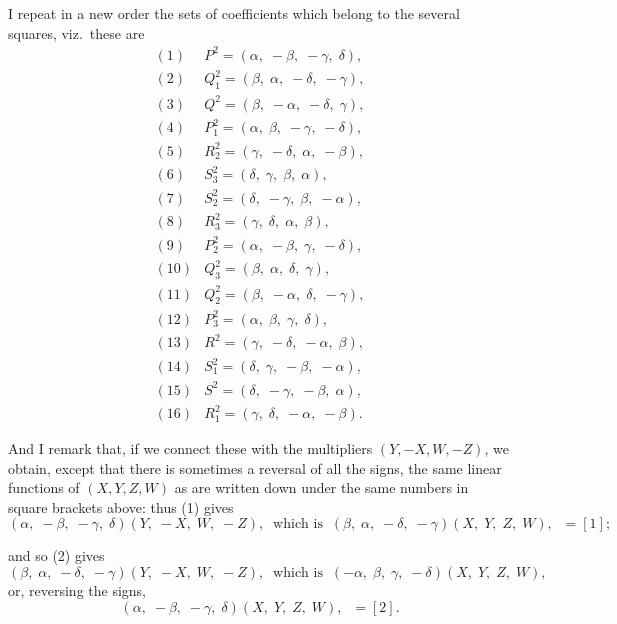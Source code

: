 \documentclass[11pt,a4paper]{article}
\begin{document}
I repeat in a new order the sets of coefficients which belong to the several squares, viz.\ these are
\[
\begin{array}{rl}
(1) & P^{2} = (\alpha,\;-\beta,\;-\gamma,\;\delta),\\
(2) & Q_{1}^{2} = (\beta,\;\alpha,\;-\delta,\;-\gamma),\\
(3) & Q^{2} = (\beta,\;-\alpha,\;-\delta,\;\gamma),\\
(4) & P_{1}^{2} = (\alpha,\;\beta,\;-\gamma,\;-\delta),\\
(5) & R_{2}^{2} = (\gamma,\;-\delta,\;\alpha,\;-\beta),\\
(6) & S_{3}^{2} = (\delta,\;\gamma,\;\beta,\;\alpha),\\
(7) & S_{2}^{2} = (\delta,\;-\gamma,\;\beta,\;-\alpha),\\
(8) & R_{3}^{2} = (\gamma,\;\delta,\;\alpha,\;\beta),\\
(9) & P_{2}^{2} = (\alpha,\;-\beta,\;\gamma,\;-\delta),\\
(10) & Q_{3}^{2} = (\beta,\;\alpha,\;\delta,\;\gamma),\\
(11) & Q_{2}^{2} = (\beta,\;-\alpha,\;\delta,\;-\gamma),\\
(12) & P_{3}^{2} = (\alpha,\;\beta,\;\gamma,\;\delta),\\
(13) & R^{2} = (\gamma,\;-\delta,\;-\alpha,\;\beta),\\
(14) & S_{1}^{2} = (\delta,\;\gamma,\;-\beta,\;-\alpha),\\
(15) & S^{2} = (\delta,\;-\gamma,\;-\beta,\;\alpha),\\
(16) & R_{1}^{2} = (\gamma,\;\delta,\;-\alpha,\;-\beta).
\end{array}
\]

\medskip

And I remark that, if we connect these with the multipliers $(Y, -X, W, -Z)$, we obtain, except that there is sometimes a reversal of all the signs, the same linear functions of $(X, Y, Z, W)$ as are written down under the same numbers in square brackets above: thus (1) gives
\[
(\alpha,\;-\beta,\;-\gamma,\;\delta)(Y,\;-X,\;W,\;-Z),\;\;\text{which is}\;\;(\beta,\;\alpha,\;-\delta,\;-\gamma)(X,\;Y,\;Z,\;W),\;\;=[1];
\]

\newpage


\noindent and so (2) gives
\[
(\beta,\;\alpha,\;-\delta,\;-\gamma)(Y,\;-X,\;W,\;-Z),\;\;\text{which is}\;\;(-\alpha,\;\beta,\;\gamma,\;-\delta)(X,\;Y,\;Z,\;W),
\]
or, reversing the signs,
\[
(\alpha,\;-\beta,\;-\gamma,\;\delta)(X,\;Y,\;Z,\;W),\;\;=[2].
\]
\end{document}
